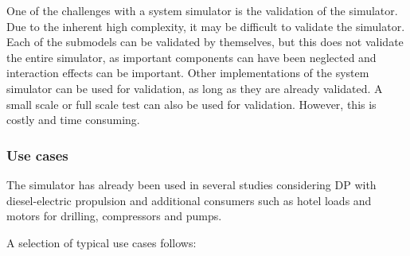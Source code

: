 \documentclass[journal]{IEEEtran}
\begin{document}
One of the challenges with a system simulator is the validation of the simulator.
Due to the inherent high complexity, it may be difficult to validate the simulator.
Each of the submodels can be validated by themselves, but this does not validate the entire simulator, as important components can have been neglected and interaction effects can be important.
Other implementations of the system simulator can be used for validation, as long as they are already validated.
A small scale or full scale test can also be used for validation.
However, this is costly and time consuming.

\subsubsection{Use cases}\label{sec:use-cases}
The simulator has already been used in several studies considering DP with diesel-electric propulsion and additional consumers such as hotel loads and motors for drilling, compressors and pumps.

A selection of typical use cases follows:
\end{document}
